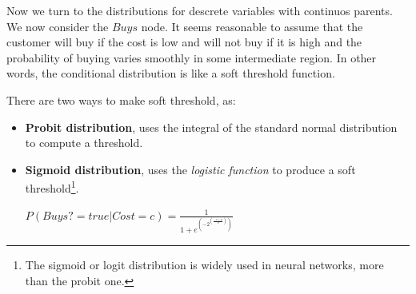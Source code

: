 \begin{example}
    Now we turn to the distributions for descrete variables with continuos parents. We now consider the $Buys$ node. It seems reasonable to assume that the customer will buy if the cost is low 
    and will not buy if it is high and the probability of buying varies smoothly in some intermediate region. In other words, the conditional distribution is like a soft threshold function. \vspace{3.5pt}

    There are two ways to make soft threshold, as:
    \begin{itemize}
        \renewcommand{\labelitemi}{-}
        \item \textbf{Probit distribution}, uses the integral of the standard normal distribution to compute a threshold.
        \item \textbf{Sigmoid distribution}, uses the \textit{logistic function} to produce a soft threshold\footnote{The sigmoid or logit distribution is widely used in neural networks, more than the probit one.}.
        \begin{center}
            $P(Buys? = true | Cost = c) = \frac{1}{1+e^{(-2^{(\frac{-c+\mu}{\sigma})})}}$
        \end{center}
    \end{itemize}
\end{example}